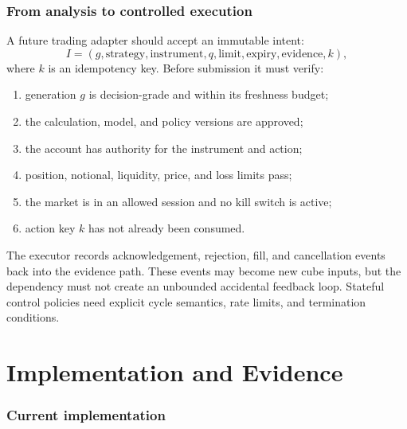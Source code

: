 \documentclass{strategynet-journal}
\begin{document}
\section{From analysis to controlled execution}

A future trading adapter should accept an immutable intent:
\[
  I=(g,\text{strategy},\text{instrument},q,\text{limit},
     \text{expiry},\text{evidence},k),
\]
where \(k\) is an idempotency key.  Before submission it must verify:
\begin{enumerate}
  \item generation \(g\) is decision-grade and within its freshness budget;
  \item the calculation, model, and policy versions are approved;
  \item the account has authority for the instrument and action;
  \item position, notional, liquidity, price, and loss limits pass;
  \item the market is in an allowed session and no kill switch is active;
  \item action key \(k\) has not already been consumed.
\end{enumerate}

The executor records acknowledgement, rejection, fill, and cancellation events
back into the evidence path.  These events may become new cube inputs, but the
dependency must not create an unbounded accidental feedback loop.  Stateful
control policies need explicit cycle semantics, rate limits, and termination
conditions.

\clearpage
\part{Implementation and Evidence}

\section{Current implementation}
\end{document}
